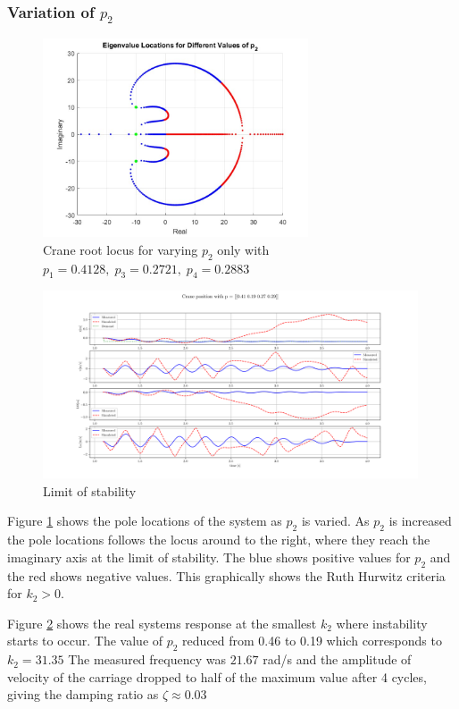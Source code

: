 \documentclass{article}
\begin{document}
\subsubsection{Variation of $p_2$}

\begin{figure}[H]
  \centering
  \includegraphics[width=0.7\textwidth]{figures/3.5roots.jpg}
  \caption{Crane root locus for varying $p_2$ only with $p_1 = 0.4128,\;p_3 = 0.2721,\;p_4 = 0.2883$}
  \label{fig:roots3.5}
\end{figure}

\begin{figure}[H]
  \centering
  \includegraphics[width=0.99\textwidth]{figures/3.5.png}
  \caption{Limit of stability}
  \label{fig:exp3.5}
\end{figure}

Figure \ref{fig:roots3.5} shows the pole locations of the system as $p_2$ is varied. As $p_2$ is increased the pole locations follows the locus around to the right, where they reach the imaginary axis at the limit of stability.
The blue shows positive values for $p_2$ and the red shows negative values. This graphically shows the Ruth Hurwitz criteria for $k_2 > 0$.

Figure \ref{fig:exp3.5} shows the real systems response at the smallest $k_2$ where instability starts to occur.
The value of $p_2$ reduced from 0.46 to 0.19 which corresponds to $k_2 = 31.35$
The measured frequency was $21.67$ rad/s and the amplitude of velocity of the carriage dropped to half of the maximum value after 4 cycles, giving the damping ratio as $\zeta \approx 0.03$
\end{document}
